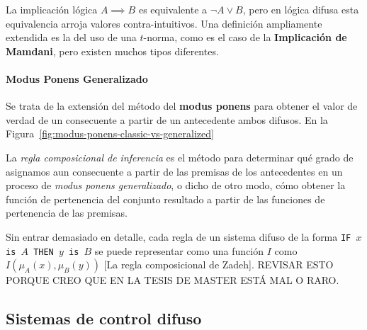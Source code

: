 La implicación lógica $A \implies B$ es equivalente a $\lnot A \lor B$, pero en lógica difusa esta equivalencia arroja valores contra-intuitivos. Una definición ampliamente extendida es la del uso de una $t$-norma, como es el caso de la \textbf{Implicación de Mamdani}, pero existen muchos tipos diferentes.

\paragraph{Modus Ponens Generalizado}

Se trata de la extensión del método del \textbf{modus ponens} para obtener el valor de verdad de un consecuente a partir de un antecedente ambos difusos. En la Figura~\ref{fig:modus-ponens-classic-vs-generalized}

\begin{figure*}
	\centering
	\caption[Diferencias entre \textit{modus ponens} clásico y \textit{modus ponens generalizado}.]{Diferencias entre \textit{modus ponens} clásico y \textit{modus ponens generalizado}. Debido a que los valores de las reglas de inferencia difusa son conjuntos difusos, la conclusión de un silogismo es por tanto un conjunto difuso, no un valor absoluto de verdad o mentira.}
	\label{fig:modus-ponens-classic-vs-generalized}
\end{figure*}

La \textit{regla composicional de inferencia} es el método para determinar qué grado de asignamos aun consecuente a partir de las premisas de los antecedentes en un proceso de \textit{modus ponens generalizado}, o dicho de otro modo, cómo obtener la función de pertenencia del conjunto resultado a partir de las funciones de pertenencia de las premisas.

Sin entrar demasiado en detalle, cada regla de un sistema difuso de la forma \texttt{IF $x$ is $A$ THEN $y$ is $B$} se puede representar como una función $I$ como $I(\mu_A(x), \mu_B(y))$ [La regla composicional de Zadeh]. REVISAR ESTO PORQUE CREO QUE EN LA TESIS DE MASTER ESTÁ MAL O RARO.

\subsection{Sistemas de control difuso}
\label{ss:fcs}

